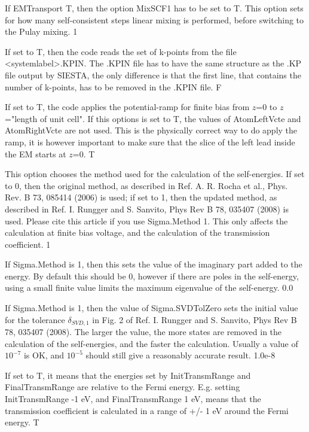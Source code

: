 \documentclass[11pt]{article}
\begin{document}
{
{If EMTransport T, then the option MixSCF1 has to be set to T. This option sets for how many self-consistent steps linear mixing is performed, before switching to the Pulay mixing.}
{1}

{If set to T, then the code reads the set of k-points from the file <systemlabel>.KPIN. The .KPIN file has to have the same structure as the .KP file output by SIESTA, the only difference is that the first line, that contains the number of k-points, has to be removed in the .KPIN file.}
{F}

{If set to T, the code applies the potential-ramp for finite bias from $z$=0 to $z$="length of unit cell". If this options is set to T, the values of AtomLeftVcte and AtomRightVcte are not used. This is the physically correct way to do apply the ramp, it is however important to make sure that the slice of the left lead inside the EM starts at $z$=0.}
{T}

{This option chooses the method used for the calculation of the self-energies. If set to 0, then the original method, as described in Ref. A. R. Rocha et al., Phys. Rev. B 73, 085414 (2006) is used; if set to 1, then the updated method, as described in Ref. I. Rungger and S. Sanvito, Phys Rev B 78, 035407 (2008) is used. Please cite this article if you use Sigma.Method 1. This only affects the calculation at finite bias voltage, and the calculation of the transmission coefficient.}
{1}

{If Sigma.Method is 1, then this sets the value of the imaginary part added to the energy. By default this should be 0, however if there are poles in the self-energy, using a small finite value limits the maximum eigenvalue of the self-energy.}
{0.0}

{If Sigma.Method is 1, then the value of Sigma.SVDTolZero sets the initial value for the tolerance $\delta_{SVD,1}$ in Fig. 2 of Ref. I. Rungger and S. Sanvito, Phys Rev B 78, 035407 (2008). The larger the value, the more states are removed in the calculation of the self-energies, and the faster the calculation. Usually a value of $10^{-7}$ is OK, and $10^{-5}$ should still give a reasonably accurate result.}
{1.0e-8}

{If set to T, it means that the energies set by InitTransmRange and FinalTransmRange are relative to the Fermi energy. E.g. setting InitTransmRange -1 eV, and FinalTransmRange 1 eV, means that the transmission coefficient is calculated in a range of +/- 1 eV around the Fermi energy.}
{T}

}
\end{document}
